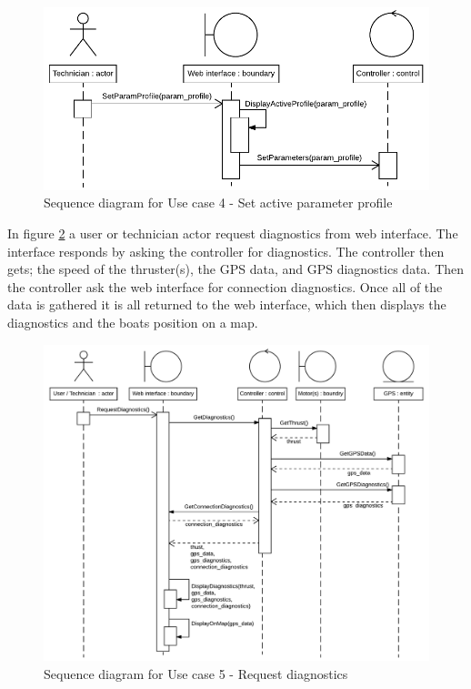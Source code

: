 \begin{figure}[H]
	\centering
	\includegraphics[width=1\linewidth]{Images/System_architecture/Use_case_4_SD}
	\caption{Sequence diagram for Use case 4 - Set active parameter profile}
	\label{fig:seq:uc4}
\end{figure}

In figure \ref{fig:seq:uc5} a user or technician actor request diagnostics from web interface. The interface responds by asking the controller for diagnostics. The controller then gets; the speed of the thruster(s), the GPS data, and GPS diagnostics data. Then the controller ask the web interface for connection diagnostics. Once all of the data is gathered it is all returned to the web interface, which then displays the diagnostics and the boats position on a map.

\begin{figure}[H]
	\centering
	\includegraphics[width=1\linewidth]{Images/System_architecture/Use_case_5_SD}
	\caption{Sequence diagram for Use case 5 - Request diagnostics}
	\label{fig:seq:uc5}
\end{figure}

